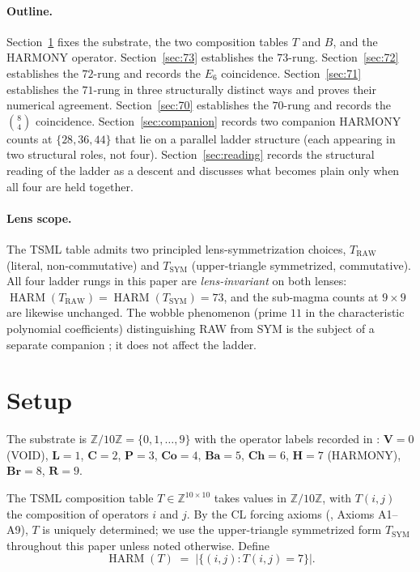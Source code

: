 \documentclass[11pt,reqno]{amsart}
\theoremstyle{definition}
\newcommand{\Z}{\mathbb{Z}}
\DeclareMathOperator{\HARM}{HARM}
\begin{document}
\paragraph{Outline.}

Section~\ref{sec:setup} fixes the substrate, the two composition
tables $T$ and $B$, and the HARMONY operator. Section~\ref{sec:73}
establishes the $73$-rung. Section~\ref{sec:72} establishes the
$72$-rung and records the $E_6$ coincidence. Section~\ref{sec:71}
establishes the $71$-rung in three structurally distinct ways and
proves their numerical agreement. Section~\ref{sec:70} establishes
the $70$-rung and records the $\binom{8}{4}$ coincidence.
Section~\ref{sec:companion} records two companion HARMONY counts at
$\{28, 36, 44\}$ that lie on a parallel ladder structure (each
appearing in two structural roles, not four).
Section~\ref{sec:reading} records the structural reading of the
ladder as a descent and discusses what becomes plain only when all
four are held together.

\paragraph{Lens scope.}

The TSML table admits two principled lens-symmetrization choices,
$T_{\mathrm{RAW}}$ (literal, non-commutative) and $T_{\mathrm{SYM}}$
(upper-triangle symmetrized, commutative). All four ladder rungs in
this paper are \emph{lens-invariant} on both lenses:
$\HARM(T_{\mathrm{RAW}}) = \HARM(T_{\mathrm{SYM}}) = 73$, and the
sub-magma counts at $9 \times 9$ are likewise unchanged. The wobble
phenomenon (prime $11$ in the characteristic polynomial coefficients)
distinguishing RAW from SYM is the subject of a separate
companion \cite{Sanders2026Wobble}; it does not affect the ladder.

\section{Setup}
\label{sec:setup}

The substrate is $\Z/10\Z = \{0, 1, \ldots, 9\}$ with the operator
labels recorded in \cite{Sanders2026CLAxioms}: $\mathbf{V} = 0$
(VOID), $\mathbf{L} = 1$, $\mathbf{C} = 2$, $\mathbf{P} = 3$,
$\mathbf{Co} = 4$, $\mathbf{Ba} = 5$, $\mathbf{Ch} = 6$, $\mathbf{H}
= 7$ (HARMONY), $\mathbf{Br} = 8$, $\mathbf{R} = 9$.

The TSML composition table $T \in \Z^{10 \times 10}$ takes values in
$\Z/10\Z$, with $T(i, j)$ the composition of operators $i$ and $j$.
By the CL forcing axioms (\cite{Sanders2026CLAxioms}, Axioms A1--A9),
$T$ is uniquely determined; we use the upper-triangle symmetrized
form $T_{\mathrm{SYM}}$ throughout this paper unless noted otherwise.
Define
\[
  \HARM(T) \;=\; |\{(i, j) : T(i, j) = 7\}|.
\]
\end{document}
